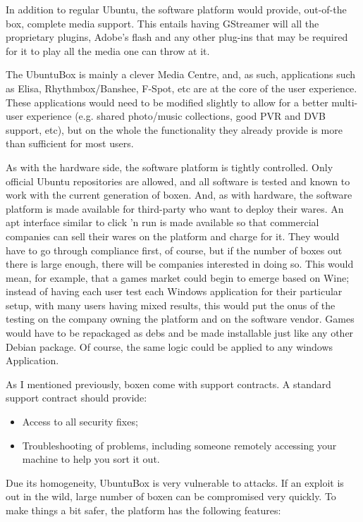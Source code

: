 \documentclass{memoir}
\begin{document}
In addition to regular Ubuntu, the software platform would provide,
out-of-the box, complete media support. This entails having GStreamer
will all the proprietary plugins, Adobe's flash and any other plug-ins
that may be required for it to play all the media one can throw at it.

The UbuntuBox is mainly a clever Media Centre, and, as such,
applications such as Elisa, Rhythmbox/Banshee, F-Spot, etc are at the
core of the user experience. These applications would need to be
modified slightly to allow for a better multi-user experience
(e.g. shared photo/music collections, good PVR and DVB support, etc),
but on the whole the functionality they already provide is more than
sufficient for most users.

As with the hardware side, the software platform is tightly
controlled. Only official Ubuntu repositories are allowed, and all
software is tested and known to work with the current generation of
boxen. And, as with hardware, the software platform is made available
for third-party who want to deploy their wares. An apt interface
similar to click 'n run is made available so that commercial companies
can sell their wares on the platform and charge for it. They would
have to go through compliance first, of course, but if the number of
boxes out there is large enough, there will be companies interested in
doing so. This would mean, for example, that a games market could
begin to emerge based on Wine; instead of having each user test each
Windows application for their particular setup, with many users having
mixed results, this would put the onus of the testing on the company
owning the platform and on the software vendor. Games would have to be
repackaged as debs and be made installable just like any other Debian
package. Of course, the same logic could be applied to any windows
Application.

As I mentioned previously, boxen come with support contracts. A
standard support contract should provide:

\begin{itemize}
\item Access to all security fixes;
\item Troubleshooting of problems, including someone remotely
  accessing your machine to help you sort it out.
\end{itemize}

Due its homogeneity, UbuntuBox is very vulnerable to attacks. If an
exploit is out in the wild, large number of boxen can be compromised
very quickly. To make things a bit safer, the platform has the
following features:
\end{document}

